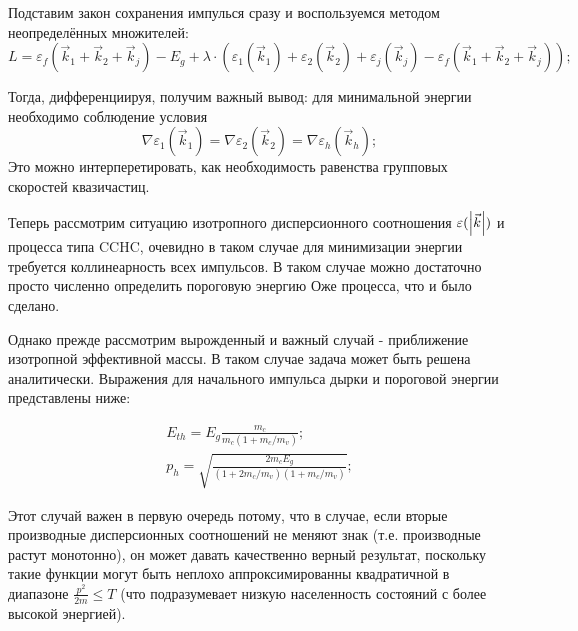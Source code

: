 \documentclass[../main.tex]{subfiles}
\begin{document}
        Подставим закон сохранения импулься сразу и воспользуемся методом неопределённых множителей:
        \begin{equation}
            L = \varepsilon_f(\vec{k}_1 + \vec{k}_2 + \vec{k}_j) - E_g + \lambda \cdot \left(\varepsilon_1(\vec{k}_1) + 
            \varepsilon_2(\vec{k}_2) + \varepsilon_j(\vec{k}_j) - \varepsilon_f(\vec{k}_1 + \vec{k}_2 + \vec{k}_j)\right);
        \end{equation}

        Тогда, дифференциируя, получим важный  вывод: для минимальной энергии необходимо соблюдение условия
        \begin{equation}
            \nabla \varepsilon_1(\vec{k}_1) = \nabla \varepsilon_2(\vec{k}_2) = \nabla \varepsilon_h(\vec{k}_h);
        \end{equation}
        Это можно интерперетировать, как необходимость равенства групповых скоростей квазичастиц.

        Теперь рассмотрим ситуацию изотропного дисперсионного соотношения $\varepsilon(\abs{\vec k})$
        и процесса типа CCHC,
        очевидно в таком случае для минимизации энергии требуется коллинеарность всех импульсов. 
        В таком случае можно достаточно просто численно определить пороговую энергию Оже процесса, что и было сделано.

        Однако прежде рассмотрим вырожденный и важный случай - приближение изотропной эффективной массы.
        В таком случае задача может быть решена аналитически. Выражения для начального импульса дырки
        и пороговой энергии представлены ниже:

        \begin{equation}
            \begin{array}{l}
                E_{th} = E_g \frac{m_c}{m_c ( 1 + m_c / m_v)};\\
                p_{h} = \sqrt{\frac{2m_c E_g}{(1+ 2m_c/m_v)(1+ m_c / m_v)}};
            \end{array}
        \end{equation}

        Этот случай важен в первую очередь потому, что в случае, если вторые производные дисперсионных соотношений не меняют знак
        (т.е. производные растут монотонно), он может давать качественно верный результат, поскольку такие функции могут быть
        неплохо аппроксимированны квадратичной в диапазоне $\frac{p^2}{2m} \leq T$ (что подразумевает низкую населенность состояний
        с более высокой энергией).
\end{document}
